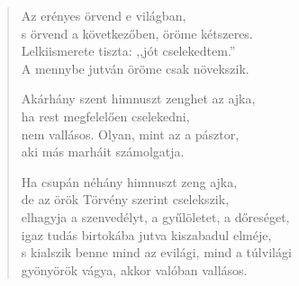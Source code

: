 \begin{verse}
 Az erényes örvend e világban,\\
s örvend a következőben, öröme kétszeres.\\
Lelkiismerete tiszta: ,,jót cselekedtem.''\\
A mennybe jutván öröme csak növekszik.

 Akárhány szent himnuszt zenghet az ajka,\\
ha rest megfelelően cselekedni,\\
nem vallásos. Olyan, mint az a pásztor,\\
aki más marháit számolgatja.

 Ha csupán néhány himnuszt zeng ajka,\\
de az örök Törvény szerint cselekszik,\\
elhagyja a szenvedélyt, a gyűlöletet, a dőreséget,\\
igaz tudás birtokába jutva kiszabadul elméje,\\
s kialszik benne mind az evilági, mind a túlvilági\\
gyönyörök vágya, akkor valóban vallásos.

\end{verse}
